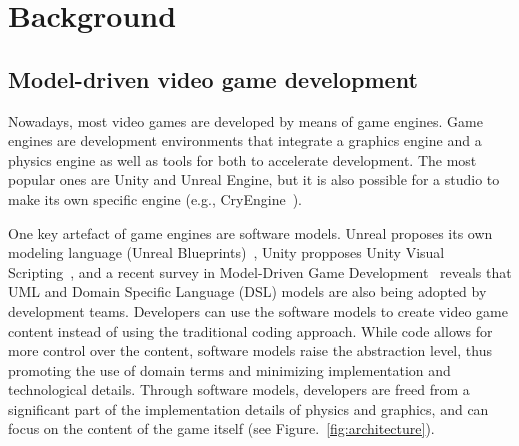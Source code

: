 \section{Background} \label{sec:Background}

\subsection{Model-driven video game development}
Nowadays, most video games are developed by means of game engines. Game engines are development environments that integrate a graphics engine and a physics engine as well as tools for both to accelerate development. The most popular ones are Unity and Unreal Engine, but it is also possible for a studio to make its own specific engine (e.g., CryEngine~\cite{cryengine}). 

One key artefact of game engines are software models. Unreal proposes its own modeling language (Unreal Blueprints)~\cite{unrealblueprint}, Unity propposes Unity Visual Scripting~\cite{unityscripting}, and a recent survey in Model-Driven Game Development~\cite{zhu2019model} reveals that UML and Domain Specific Language (DSL) models are also being adopted by development teams. Developers can use the software models to create video game content instead of using the traditional coding approach. While code allows for more control over the content, software models raise the abstraction level, thus promoting the use of domain terms and minimizing implementation and technological details. Through software models, developers are freed from a significant part of the implementation details of physics and graphics, and can focus on the content of the game itself (see Figure.~\ref{fig:architecture}).

